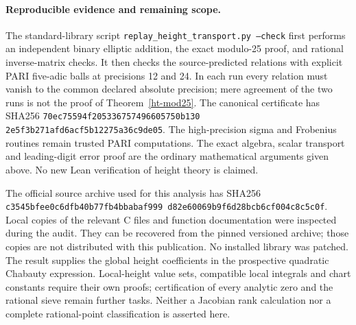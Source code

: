 \paragraph{Reproducible evidence and remaining scope.}
The standard-library script
\texttt{replay\_height\_\allowbreak transport.py --check}
first performs an independent binary elliptic addition, the exact
modulo-25 proof, and rational inverse-matrix checks. It then checks
the source-predicted relations with explicit PARI five-adic balls at
precisions 12 and 24. In each run every relation must vanish to the
common declared absolute precision; mere agreement of the two runs
is not the proof of Theorem~\ref{ht-mod25}. The canonical certificate
has SHA256
\texttt{70ec75594f205336\allowbreak 757496605750b130\allowbreak
2e5f3b271afd6acf\allowbreak 5b12275a36c9de05}.
The high-precision sigma and Frobenius routines remain trusted PARI
computations. The exact algebra, scalar transport and leading-digit
error proof are the ordinary mathematical arguments given above.
No new Lean verification of height theory is claimed.

The official source archive used for this analysis has SHA256
\texttt{c3545bfee0c6dfb4\allowbreak 0b77fb4bbabaf999\allowbreak
d82e60069b9f6d28\allowbreak bcb6cf004c8c5c0f}.
Local copies of the relevant C files and function documentation were
inspected during the audit. They can be recovered from the pinned
versioned archive; those copies are not distributed with this publication.
No installed library was patched.
The result supplies the global height coefficients in the prospective
quadratic Chabauty expression. Local-height value sets, compatible
local integrals and chart constants require their own proofs;
certification of every analytic zero and the rational sieve remain
further tasks. Neither a Jacobian rank calculation nor a complete
rational-point classification is asserted here.
